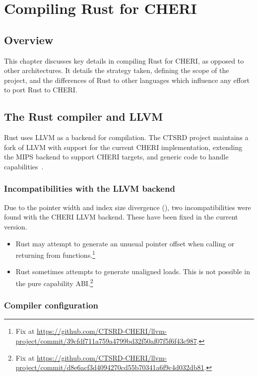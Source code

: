 \documentclass[dissertation.tex]{subfiles}
\begin{document}
\chapter{Compiling Rust for CHERI}
\label{ch:impl}


\section{Overview}

This chapter discusses key details in compiling Rust for CHERI, as
opposed to other architectures.
It details the strategy taken, defining the scope of the project, and
the differences of Rust to other languages which influence any effort to
port Rust to CHERI.

\section{The Rust compiler and LLVM}
\label{sec:impl-rustllvm}

Rust uses LLVM as a backend for compilation.
The CTSRD project maintains a fork of LLVM with support for the
current CHERI implementation, extending the MIPS backend to
support CHERI targets, and generic code to handle
capabilities~\cite{cheri-prog-guide}.

\subsection{Incompatibilities with the LLVM backend}
Due to the pointer width and index size divergence
(), two incompatibilities were found with the CHERI
LLVM backend.
These have been fixed in the current version.

\begin{itemize}
    \item Rust may attempt to generate an unusual pointer offset when
    calling or returning from functions.\footnote{Fix at \url{https://github.com/CTSRD-CHERI/llvm-project/commit/39cfdf711a759a4799bd32f50af07f5f6f43c987}.}
    \item Rust sometimes attempts to generate unaligned loads.
    This is not possible in the pure capability ABI.\footnote{Fix at \url{https://github.com/CTSRD-CHERI/llvm-project/commit/d8e6acf3d4094270cd55b70341a6f9c4d032db81}.}
\end{itemize}


\subsection{Compiler configuration}
\end{document}
